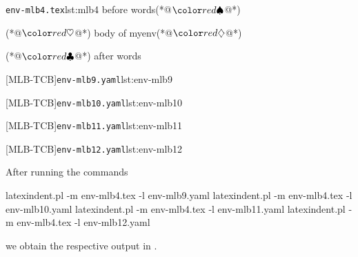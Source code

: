 	\begin{minipage}{.45\linewidth}
		\begin{cmhlistings}[escapeinside={(*@}{@*)}]{\texttt{env-mlb4.tex}}{lst:mlb4}
before words(*@$\BeginStartsOnOwnLine$@*)
\begin{myenv}(*@$\BodyStartsOnOwnLine$@*)
body of myenv(*@$\EndStartsOnOwnLine$@*)
\end{myenv}(*@$\EndFinishesWithLineBreak$@*)
after words
\end{cmhlistings}
	\end{minipage}%
	\hfill
	\begin{minipage}{.51\textwidth}
		[MLB-TCB]{\texttt{env-mlb9.yaml}}{lst:env-mlb9}

		[MLB-TCB]{\texttt{env-mlb10.yaml}}{lst:env-mlb10}

		[MLB-TCB]{\texttt{env-mlb11.yaml}}{lst:env-mlb11}

		[MLB-TCB]{\texttt{env-mlb12.yaml}}{lst:env-mlb12}
	\end{minipage}

	After running the commands
	\begin{commandshell}
latexindent.pl -m env-mlb4.tex -l env-mlb9.yaml
latexindent.pl -m env-mlb4.tex -l env-mlb10.yaml
latexindent.pl -m env-mlb4.tex -l env-mlb11.yaml
latexindent.pl -m env-mlb4.tex -l env-mlb12.yaml
\end{commandshell}

	we obtain the respective output in .

	\begin{minipage}{.45\linewidth}
	\end{minipage}
	\hfill
	\begin{minipage}{.45\linewidth}
	\end{minipage}

	\begin{minipage}{.45\linewidth}
	\end{minipage}
	\hfill
	\begin{minipage}{.45\linewidth}
	\end{minipage}

